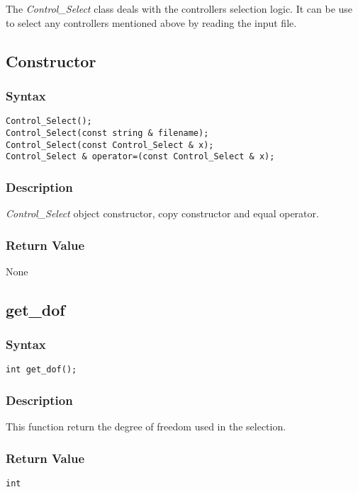 \documentclass[dvips,11pt,fleqn]{report}
\begin{document}
The \emph{Control\_Select} class deals with the controllers
selection logic. It can be use to select any controllers mentioned
above by reading the input file.
\subsection*{Constructor}
\subsubsection*{Syntax}
\begin{verbatim}
Control_Select();
Control_Select(const string & filename);
Control_Select(const Control_Select & x);
Control_Select & operator=(const Control_Select & x);
\end{verbatim}

\subsubsection*{Description}   
\emph{Control\_Select} object constructor, copy constructor and equal
operator.

\subsubsection*{Return Value}

None

\newpage

\subsection*{get\_dof}
\subsubsection*{Syntax}
\begin{verbatim}
int get_dof();
\end{verbatim}

\subsubsection*{Description}   
This function return the degree of freedom used in the selection.
\subsubsection*{Return Value}

\texttt{int}

\newpage
\end{document}
